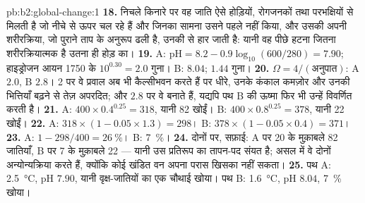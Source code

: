 \begin{solution}{pb:b2:global-change:1}
\textbf{18.} निचले किनारे पर वह जाति ऐसे होड़ियों,
रोगजनकों तथा परभक्षियों से मिलती है जो नीचे से ऊपर चल रहे हैं और जिनका सामना उसने पहले नहीं किया,
और उसकी अपनी शरीरक्रिया, जो पुराने ताप के अनुरूप ढली है,
उनकी से हार जाती है: यानी वह पीछे हटना जितना शरीरक्रियात्मक है उतना ही होड़ का।
\textbf{19.} A: $\mathrm{pH} = 8.2 - 0.9\log_{10}(600/280) = 7.90$;
हाइड्रोजन आयन 1750 के $10^{0.30} = 2.0$ गुना। B: $8.04$; $1.44$
गुना।
\textbf{20.} $\Omega = 4/(\text{अनुपात})$: A $2.0$, B $2.8$। 2 पर वे
प्रवाल अब भी कैल्सीभवन करते हैं पर धीरे, उनके कंकाल कमज़ोर और उनकी
भित्तियाँ बढ़ने से तेज़ अपरदित; और $2.8$ पर वे बनाते हैं, यद्यपि
पथ B की ऊष्मा फिर भी उन्हें विवर्णित करती है।
\textbf{21.} A: $400\times 0.4^{0.25} = 318$, यानी 82 खोईं। B:
$400\times 0.8^{0.25} = 378$, यानी 22 खोईं।
\textbf{22.} A: $318\times(1 - 0.05\times 1.3) = 298$। B:
$378\times(1 - 0.05\times 0.4) = 371$।
\textbf{23.} A: $1 - 298/400 = \qty{26}{\%}$। B: \qty{7}{\%}।
\textbf{24.} दोनों पर, सफ़ाई: A पर 20 के मुक़ाबले 82 जातियाँ, B पर 7
के मुक़ाबले 22 --- यानी उस प्रतिरूप का तापन-पद संयत है; असल में
वे दोनों अन्योन्यक्रिया करते हैं, क्योंकि कोई खंडित वन अपना परास खिसका नहीं सकता।
\textbf{25.} पथ A: \qty{2.5}{\celsius}, pH $7.90$, यानी वृक्ष-जातियों का
एक चौथाई खोया। पथ B: \qty{1.6}{\celsius}, pH $8.04$, \qty{7}{\%}
खोया।
\end{solution}
